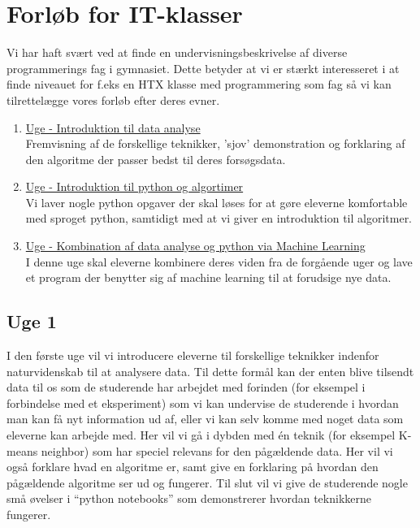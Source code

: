 \documentclass[11pt]{article}
\begin{document}
\section{Forløb for IT-klasser}
    Vi har haft svært ved at finde en undervisningsbeskrivelse af diverse
    programmerings fag i gymnasiet. Dette betyder at vi er stærkt interesseret i
    at finde niveauet for f.eks en HTX klasse med programmering som fag så vi
    kan tilrettelægge vores forløb efter deres evner.
    \begin{enumerate}
        \item \underline{Uge - Introduktion til data analyse} ~ \\
        Fremvisning af de forskellige teknikker, 'sjov' demonstration og
        forklaring af den algoritme der passer bedst til deres forsøgsdata.

        \item \underline{Uge - Introduktion til python og algortimer} ~ \\
        Vi laver nogle python opgaver der skal løses for at gøre eleverne
        komfortable med sproget python, samtidigt med at vi giver en
        introduktion til algoritmer.

        \item \underline{Uge - Kombination af data analyse og python via
        Machine Learning} ~ \\
        I denne uge skal eleverne kombinere deres viden fra de forgående uger
        og lave et program der benytter sig af machine learning til at forudsige
        nye data.
    \end{enumerate}


    \subsection*{Uge 1}
        I den første uge vil vi introducere eleverne til forskellige teknikker
        indenfor naturvidenskab til at analysere data. Til dette formål kan der
        enten blive tilsendt data til os som de studerende har arbejdet med
        forinden (for eksempel i forbindelse med et eksperiment) som vi kan
        undervise de studerende i hvordan man kan få nyt information ud af,
        eller vi kan selv komme med noget data som eleverne kan arbejde med.
        Her vil vi gå i dybden med én teknik (for eksempel K-means neighbor)
        som har speciel relevans for den pågældende data. Her vil vi også
        forklare hvad en algoritme er, samt give en forklaring på hvordan den
        pågældende algoritme ser ud og fungerer. Til slut vil vi give de
        studerende nogle små øvelser i ``python notebooks'' som demonstrerer
        hvordan teknikkerne fungerer.
\end{document}
